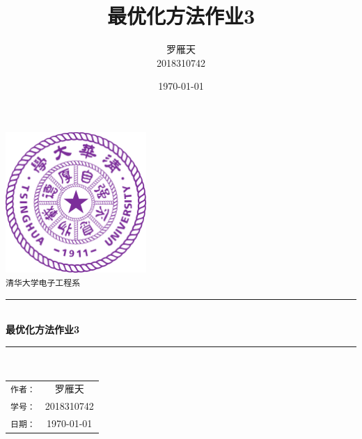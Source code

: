 \documentclass[a4paper]{article}
\title{最优化方法作业3}
\author{罗雁天 \\
2018310742}
\date{\today}
\begin{document}
\newcommand{\HRule}{\rule{\linewidth}{0.5mm}}
\begin{titlepage}
	\begin{center}
		\includegraphics[width=0.4\textwidth]{Tsinghua2.png}\\[1cm]
		\textsc{\Large \texttt{清华大学电子工程系}}\\[1cm]
		\HRule \\[1cm]
		{\Huge \bfseries 最优化方法作业3}\\[0.4cm]
		\HRule \\[3.5cm]
		\begin{minipage}{0.4\textwidth}
			\begin{center}
				\Large
				\begin{tabular}{cc}
					\texttt{作者：} & 罗雁天 \\[0.5cm]
					\texttt{学号：} & 2018310742 \\[0.5cm]
					\texttt{日期：} & \today
				\end{tabular}
			\end{center}
		\end{minipage}
		\vfill
	\end{center}
\end{titlepage}
\end{document}
